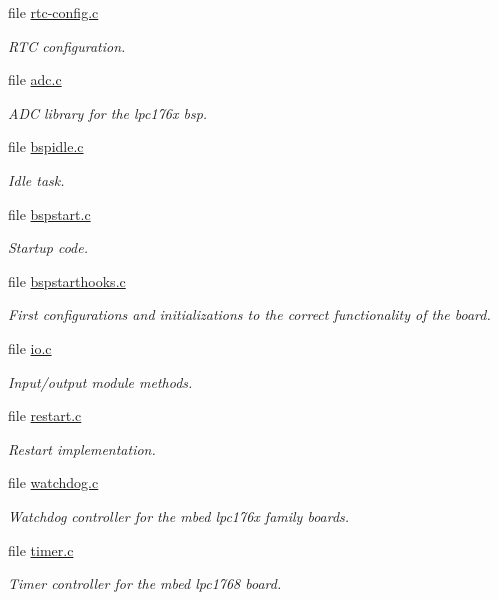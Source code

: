 \begin{DoxyCompactItemize}
file \mbox{\hyperlink{arm_2lpc176x_2rtc_2rtc-config_8c}{rtc-\/config.\+c}}
\begin{DoxyCompactList}\small\item\em R\+TC configuration. \end{DoxyCompactList}\item 
file \mbox{\hyperlink{adc_8c}{adc.\+c}}
\begin{DoxyCompactList}\small\item\em A\+DC library for the lpc176x bsp. \end{DoxyCompactList}\item 
file \mbox{\hyperlink{arm_2lpc176x_2start_2bspidle_8c}{bspidle.\+c}}
\begin{DoxyCompactList}\small\item\em Idle task. \end{DoxyCompactList}\item 
file \mbox{\hyperlink{arm_2lpc176x_2start_2bspstart_8c}{bspstart.\+c}}
\begin{DoxyCompactList}\small\item\em Startup code. \end{DoxyCompactList}\item 
file \mbox{\hyperlink{lpc176x_2start_2bspstarthooks_8c}{bspstarthooks.\+c}}
\begin{DoxyCompactList}\small\item\em First configurations and initializations to the correct functionality of the board. \end{DoxyCompactList}\item 
file \mbox{\hyperlink{bsps_2arm_2lpc176x_2start_2io_8c}{io.\+c}}
\begin{DoxyCompactList}\small\item\em Input/output module methods. \end{DoxyCompactList}\item 
file \mbox{\hyperlink{arm_2lpc176x_2start_2restart_8c}{restart.\+c}}
\begin{DoxyCompactList}\small\item\em Restart implementation. \end{DoxyCompactList}\item 
file \mbox{\hyperlink{arm_2lpc176x_2start_2watchdog_8c}{watchdog.\+c}}
\begin{DoxyCompactList}\small\item\em Watchdog controller for the mbed lpc176x family boards. \end{DoxyCompactList}\item 
file \mbox{\hyperlink{arm_2lpc176x_2timer_2timer_8c}{timer.\+c}}
\begin{DoxyCompactList}\small\item\em Timer controller for the mbed lpc1768 board. \end{DoxyCompactList}\end{DoxyCompactItemize}

